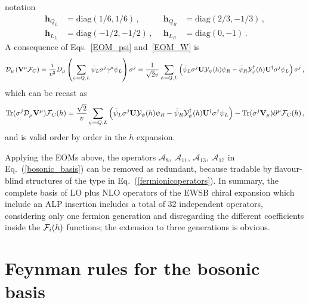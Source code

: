 \documentclass[11pt]{article}
\newcommand{\g}{\gamma}
\newcommand{\s}{\sigma}
\newcommand{\A}{\mathcal{A}}
\newcommand{\D}{\mathcal{D}}
\newcommand{\U}{\mathbf{U}}
\newcommand{\V}{\mathbf{V}}
\newcommand{\tr}{{\rm Tr}}
\newcommand{\diag}{\text{diag}}
\newcommand{\de}{\partial}
\renewcommand{\[}{\begin{equation}}
\renewcommand{\]}{\end{equation}}
\def\cF{{\cal F}}
\begin{document}
\begin{appendices}
notation
\begin{equation}
 \begin{aligned}
  \mathbf{h}_{Q_L}&=\diag\left(1/6,1/6\right)\,,\qquad&	\mathbf{h}_{Q_R}&
=\diag\left(2/3,-1/3\right)\,,\\
  \mathbf{h}_{L_L}&= \diag\left(-1/2,-1/2\right)\,,&	\mathbf{h}_{L_R}&
=\diag\left(0,-1\right)\,.
 \end{aligned}
\end{equation} 
A consequence of Eqs.~\eqref{EOM_psi} and~\eqref{EOM_W} is~\cite{Brivio:2013pma,Brivio:2016fzo}
\begin{equation}
 \D_\mu \left(\V^\mu \cF_C\right) = \frac{i}{v^2}D_\mu
\left(\sum_{\psi=Q,L}\bar{\psi}_L\s^j \g^\mu \psi_L\right)\s^j=
 \frac{1}{\sqrt2 v}\sum_{\psi=Q,L}\left(\bar\psi_L\s^j\U\mathcal{Y}_\psi(h) \psi_R
-\bar\psi_R\mathcal{Y}^\dag_\psi(h)\U^\dag\s^j \psi_L\right)\s^j\,,
\end{equation} 
which can be recast as
\begin{equation}\label{DmuVmu}
\tr(\s^j\D_\mu\V^\mu)\cF_C(h) =
\frac{\sqrt2}{v}\sum_{\psi=Q,L}\left(\bar\psi_L\s^j\U\mathcal{Y}_\psi(h) \psi_R
-\bar\psi_R\mathcal{Y}^\dag_\psi(h)\U^\dag\s^j \psi_L\right)-\tr(\s^j\V_\mu)
\de^\mu\cF_C(h)\,,
\end{equation}
and is valid order by order in the $h$ expansion.

Applying the EOMs above, the operators $\A_{8}$, $\A_{11}$, $\A_{13}$, $\A_{17}$ in Eq.~(\ref{bosonic_basis}) can be removed as redundant, because tradable by  flavour-blind structures of the type in Eq.~(\ref{fermionicoperators}). In summary,  the complete basis of LO plus NLO operators of the EWSB chiral expansion  which include an ALP insertion includes a total of 32 independent operators, considering only one fermion generation and disregarding the different coefficients inside the $\cF_i(h)$ functions; the extension to three generations is obvious.


\section{Feynman rules for the bosonic basis}
\label{App:feynman_rules}


\end{appendices}
\end{document}
